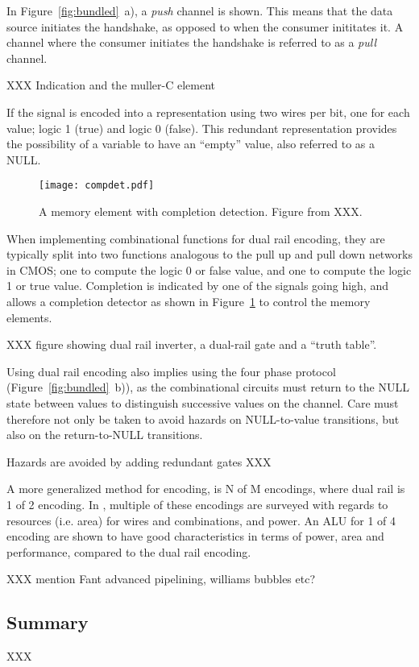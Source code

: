 In Figure~\ref{fig:bundled}~a), a \emph{push} channel is shown. This means
that the data source initiates the handshake, as opposed to when the
consumer inititates it. A channel where the consumer initiates the
handshake is referred to as a \emph{pull} channel.

XXX Indication and the muller-C element

If the signal is encoded into a representation using two wires per
bit, one for each value; logic 1 (true) and logic 0 (false). This
redundant representation provides the possibility of a variable to
have an ``empty'' value, also referred to as a NULL. 

\begin{figure}[htbp]
  \centering
  \texttt{[image: compdet.pdf]}
  \caption{A memory element with completion detection. Figure from XXX.}
  \label{fig:compdet}
\end{figure}

When implementing combinational functions for dual rail encoding, they
are typically split into two functions analogous to the pull up and
pull down networks in CMOS; one to compute the logic 0 or false value,
and one to compute the logic 1 or true value. Completion is indicated
by one of the signals going high, and allows a completion detector as
shown in Figure~\ref{fig:compdet} to control the memory elements.

XXX figure showing dual rail inverter, a dual-rail gate and a ``truth
table''.

Using dual rail encoding also implies using the four phase protocol
(Figure~\ref{fig:bundled}~b)), as the combinational circuits must
return to the NULL state between values to distinguish successive
values on the channel. Care must therefore not only be taken to avoid
hazards on NULL-to-value transitions, but also on the return-to-NULL
transitions.

Hazards are avoided by adding redundant gates XXX

A more generalized method for encoding, is N of M encodings, where
dual rail is 1 of 2 encoding. In \cite[chapter 9]{nullconv}, multiple
of these encodings are surveyed with regards to resources (i.e. area)
for wires and combinations, and power. An ALU for 1 of 4 encoding are
shown to have good characteristics in terms of power, area and
performance, compared to the dual rail encoding. 

XXX mention Fant advanced pipelining, williams bubbles etc?

\subsection{Summary}

XXX


